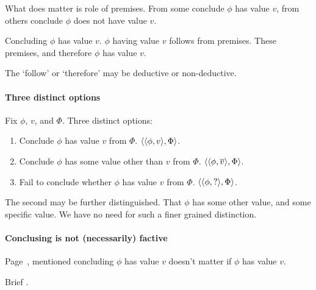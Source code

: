 \begin{note}
  What does matter is role of premises.
  From some conclude \(\phi\) has value \(v\), from others conclude \(\phi\) does not have value \(v\).
\end{note}

\begin{note}[Generally]
  Concluding \(\phi\) has value \(v\).
  \(\phi\) having value \(v\) follows from premises.
  These premises, and therefore \(\phi\) has value \(v\).

  The `follow' or `therefore' may be deductive or non-deductive.
\end{note}

\paragraph*{Three distinct options}

\begin{assumption}
  Fix \(\phi\), \(v\), and \(\Phi\).
  Three distinct options:
  \begin{enumerate}
  \item Conclude \(\phi\) has value \(v\) from \(\Phi\).
    \(\langle \langle \phi, v \rangle, \Phi \rangle\).
  \item
    Conclude \(\phi\) has some value other than \(v\) from \(\Phi\).
    \(\langle \langle \phi, \overline{v} \rangle, \Phi \rangle\).
  \item
    Fail to conclude whether \(\phi\) has value \(v\) from \(\Phi\).
    \(\langle \langle \phi, ? \rangle, \Phi \rangle\).
  \end{enumerate}
  The second may be further distinguished.
  That \(\phi\) has some other value, and some specific value.
  We have no need for such a finer grained distinction.
\end{assumption}



\paragraph*{Conclusing is not (necessarily) factive}
\label{concluding:not-factive}

\begin{note}
  Page~\pageref{mention:concluding-non-factive}, mentioned concluding \(\phi\) has value \(v\) doesn't matter if \(\phi\) has value \(v\).

  Brief .
\end{note}

